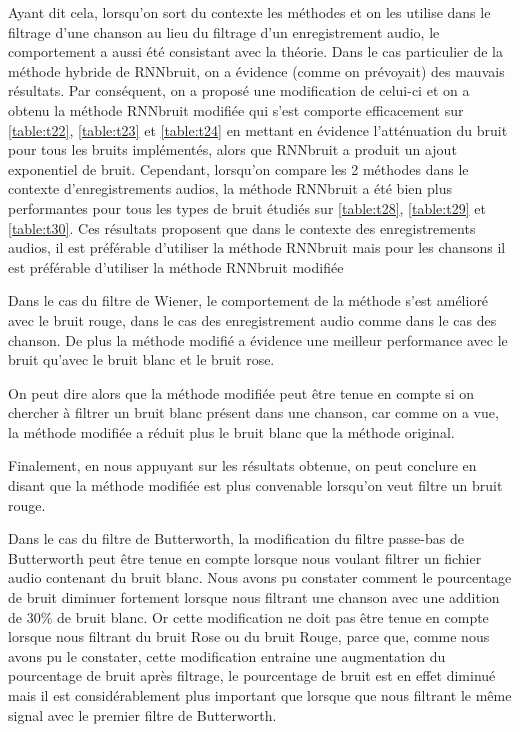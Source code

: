 \documentclass[conference,onecolumn]{IEEEtran}
\begin{document}
Ayant dit cela, lorsqu’on sort du contexte les méthodes et on les utilise dans le filtrage d’une chanson au lieu du filtrage d’un enregistrement audio, le comportement a aussi été consistant avec la théorie. Dans le cas particulier de la méthode hybride de RNNbruit, on a évidence (comme on prévoyait) des mauvais résultats. Par conséquent, on a proposé une modification de celui-ci et on a obtenu la méthode RNNbruit modifiée qui s’est comporte efficacement sur \ref{table:t22}, \ref{table:t23} et \ref{table:t24} en mettant en évidence l’atténuation du bruit pour tous les bruits implémentés, alors que RNNbruit a produit un ajout exponentiel de bruit. Cependant, lorsqu’on compare les 2 méthodes dans le contexte d’enregistrements audios, la méthode RNNbruit a été bien plus performantes pour tous les types de bruit étudiés sur \ref{table:t28}, \ref{table:t29} et \ref{table:t30}. Ces résultats proposent que dans le contexte des enregistrements audios, il est préférable d’utiliser la méthode RNNbruit mais pour les chansons il est préférable d’utiliser la méthode RNNbruit modifiée


\medskip

Dans le cas du filtre de Wiener, le comportement de la méthode s’est amélioré avec le bruit rouge, dans le cas des enregistrement audio comme dans le cas des chanson. De plus la méthode modifié a évidence une meilleur performance avec le bruit qu’avec le bruit blanc et le bruit rose. 

On peut dire alors que la méthode modifiée peut être tenue en compte si on chercher à filtrer un bruit blanc présent dans une chanson, car comme on a vue, la méthode modifiée a réduit plus le bruit blanc que la méthode original. 

Finalement, en nous appuyant sur les résultats obtenue, on peut conclure en disant que la méthode modifiée est plus convenable lorsqu’on veut filtre un bruit rouge. 


\medskip
Dans le cas du filtre de Butterworth, la modification du filtre passe-bas de Butterworth peut être tenue en compte lorsque nous voulant filtrer un fichier audio contenant du bruit blanc. Nous avons pu constater comment le pourcentage de bruit diminuer fortement lorsque nous filtrant une chanson avec une addition de 30\% de bruit blanc. Or cette modification ne doit pas être tenue en compte lorsque nous filtrant du bruit Rose ou du bruit Rouge, parce que, comme nous avons pu le constater, cette modification entraine une augmentation du pourcentage de bruit après filtrage, le pourcentage de bruit est en effet diminué mais il est considérablement plus important que lorsque que nous filtrant le même signal avec le premier filtre de Butterworth.
\end{document}
